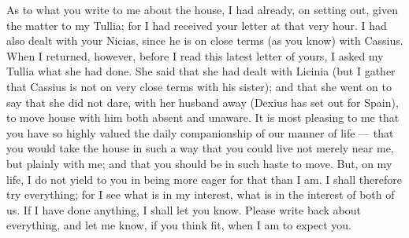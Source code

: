  As to what you write to me about the house, I had already, on setting out, given the matter to my Tullia; for I had received your letter at that very hour. I had also dealt with your Nicias, since he is on close terms (as you know) with Cassius. When I returned, however, before I read this latest letter of yours, I asked my Tullia what she had done. She said that she had dealt with Licinia (but I gather that Cassius is not on very close terms with his sister); and that she went on to say that she did not dare, with her husband away (Dexius has set out for Spain), to move house with him both absent and unaware. It is most pleasing to me that you have so highly valued the daily companionship of our manner of life --- that you would take the house in such a way that you could live not merely near me, but plainly with me; and that you should be in such haste to move. But, on my life, I do not yield to you in being more eager for that than I am. I shall therefore try everything; for I see what is in my interest, what is in the interest of both of us. If I have done anything, I shall let you know. Please write back about everything, and let me know, if you think fit, when I am to expect you.
